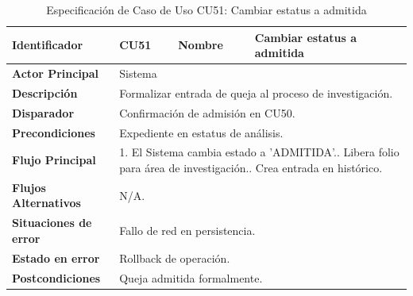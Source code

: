 \begingroup
\setlength{\parskip}{0pt}
\begin{longtable}{|p{3.5cm}|p{2cm}|p{2.5cm}|p{7cm}|}
\caption{Especificación de Caso de Uso CU51: Cambiar estatus a admitida}
\label{tab:cu51} \\
\hline
\textbf{Identificador} & CU51 & \textbf{Nombre} & Cambiar estatus a admitida \\ \hline
\textbf{Actor Principal} & \multicolumn{3}{p{11.5cm}|}{Sistema} \\ \hline
\textbf{Descripción} & \multicolumn{3}{p{11.5cm}|}{Formalizar entrada de queja al proceso de investigación.} \\ \hline
\textbf{Disparador} & \multicolumn{3}{p{11.5cm}|}{Confirmación de admisión en CU50.} \\ \hline
\textbf{Precondiciones} & \multicolumn{3}{p{11.5cm}|}{Expediente en estatus de análisis.} \\ \hline
\textbf{Flujo Principal} & \multicolumn{3}{p{11.5cm}|}{1. El Sistema cambia estado a 'ADMITIDA'.\newline 2. Libera folio para área de investigación.\newline 3. Crea entrada en histórico.} \\ \hline
\textbf{Flujos Alternativos} & \multicolumn{3}{p{11.5cm}|}{N/A.} \\ \hline
\textbf{Situaciones de error} & \multicolumn{3}{p{11.5cm}|}{Fallo de red en persistencia.} \\ \hline
\textbf{Estado en error} & \multicolumn{3}{p{11.5cm}|}{Rollback de operación.} \\ \hline
\textbf{Postcondiciones} & \multicolumn{3}{p{11.5cm}|}{Queja admitida formalmente.} \\ \hline
\end{longtable}
\endgroup